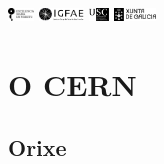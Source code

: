 \documentclass{beamer}
\begin{document}

\begin{frame}[plain,backgroundpicture=gpx/cms_higgs_43,overlaytitlepage=0.9]
  \begin{minipage}[b][\textheight][b]{5cm}
    \includegraphics[height=0.35cm]{logos/maeztu_bw}\hspace{1mm}
    \includegraphics[height=0.35cm]{logos/igfae_bw}\hspace{1mm}
    \includegraphics[height=0.35cm]{logos/usc_bw}\hspace{1mm}
    \includegraphics[height=0.35cm]{logos/xunta_bw}\hspace{1mm}
  \end{minipage}
\end{frame}

\begin{frame}[plain,backgroundpicture=gpx/cms_higgs_43,overlaytoc=0.9]
  \addtocounter{framenumber}{-1}
  \hspace*{7.3cm}\begin{minipage}{8cm}
    \tableofcontents
  \end{minipage}
\end{frame}




\section{O CERN}



\subsection{Orixe}
\end{document}
